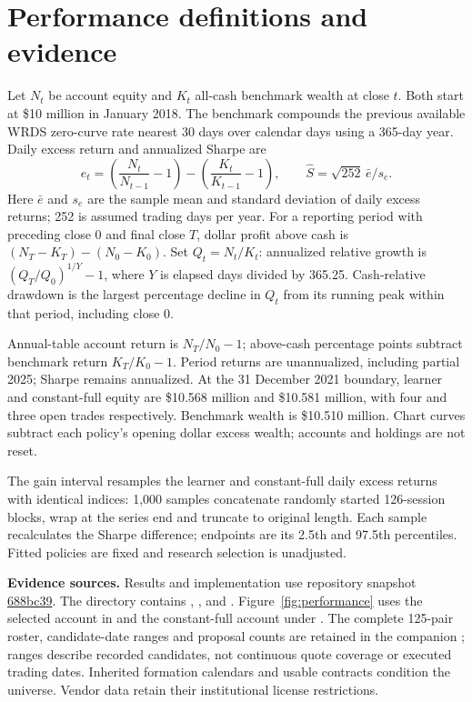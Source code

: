 \documentclass[11pt,letterpaper]{article}
\newcommand{\money}[1]{\$#1}
\begin{document}
\clearpage
\section{Performance definitions and evidence}
\label{app:metrics}
Let $N_t$ be account equity and $K_t$ all-cash benchmark wealth at close $t$.
Both start at \money{10 million} in January 2018. The benchmark compounds the
previous available WRDS zero-curve rate nearest 30 days over calendar days
using a 365-day year. Daily excess return and annualized Sharpe are
\[
e_t=\left(\frac{N_t}{N_{t-1}}-1\right)
-\left(\frac{K_t}{K_{t-1}}-1\right),\qquad
\widehat S=\sqrt{252}\,\bar e/s_e.
\]
Here $\bar e$ and $s_e$ are the sample mean and standard deviation of daily
excess returns; 252 is assumed trading days per year. For a reporting period
with preceding close $0$ and final close $T$, dollar profit above cash is
$(N_T-K_T)-(N_0-K_0)$. Set $Q_t=N_t/K_t$: annualized relative growth is
$(Q_T/Q_0)^{1/Y}-1$, where $Y$ is elapsed days divided by 365.25.
Cash-relative drawdown is the largest percentage decline in $Q_t$ from its
running peak within that period, including close $0$.

Annual-table account return is $N_T/N_0-1$; above-cash percentage points
subtract benchmark return $K_T/K_0-1$. Period returns are unannualized,
including partial 2025; Sharpe remains annualized. At the 31 December 2021
boundary, learner and constant-full equity are \money{10.568 million} and
\money{10.581 million}, with four and three open trades respectively.
Benchmark wealth is \money{10.510 million}. Chart curves subtract each policy's
opening dollar excess wealth; accounts and holdings are not reset.

The gain interval resamples the learner and constant-full daily excess returns
with identical indices: 1,000 samples concatenate randomly started 126-session
blocks, wrap at the series end and truncate to original length. Each sample
recalculates the Sharpe difference; endpoints are its 2.5th and 97.5th
percentiles. Fitted policies are fixed and research selection is unadjusted.

{\raggedright
\textbf{Evidence sources.} Results and implementation use repository snapshot
\href{https://github.com/kreitzz/rl-atm-vega-pairs/tree/688bc3909ba09be77af90df2d1c2696f316fedbe}{688bc39}.
The directory  contains
, ,  and
. Figure~\ref{fig:performance} uses the selected account in
 and the constant-full account
under .
The complete 125-pair roster, candidate-date ranges and proposal counts are
retained in the companion ; ranges describe
recorded candidates, not continuous quote coverage or executed trading dates.
Inherited formation calendars and usable contracts condition the universe.
Vendor data retain their institutional license restrictions.\par}
\end{document}
